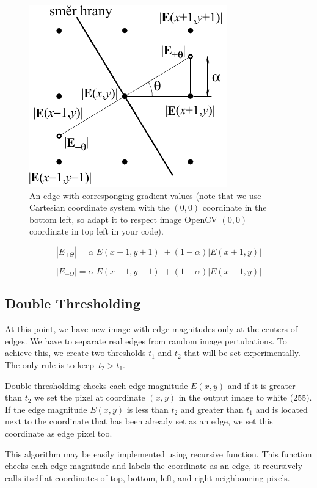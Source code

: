 \documentclass[12pt]{article}
\begin{document}
\begin{figure}[h]
\begin{centering}
    \includegraphics{pixel_scheme}
    \caption{An edge with corresponging gradient values (note that we use Cartesian coordinate system with the $(0, 0)$ coordinate in the bottom left, so adapt it to respect image OpenCV $(0, 0)$ coordinate in top left in your code).}
    \label{fig:pixel-scheme}
\end{centering}
\end{figure}

\begin{equation}
    |E_{+\Theta}| = \alpha |E(x + 1, y + 1)| + (1 - \alpha) |E(x + 1, y)|
    \label{eq:e-plus}
\end{equation}

\begin{equation}
    |E_{-\Theta}| = \alpha |E(x - 1, y - 1)| + (1 - \alpha) |E(x - 1, y)|
    \label{eq:e-minus}
\end{equation}

\subsection*{Double Thresholding}

At this point, we have new image with edge magnitudes only at the centers of edges.
We have to separate real edges from random image pertubations.
To achieve this, we create two thresholds $t_1$ and $t_2$ that will be set experimentally.
The only rule is to keep~$t_2 > t_1$.

Double thresholding checks each edge magnitude $E(x, y)$ and if it is greater than $t_2$ we set the pixel at coordinate $(x, y)$
in the output image to white (255). If the edge magnitude $E(x, y)$ is less than $t_2$ and greater than $t_1$ and is
located next to the coordinate that has been already set as an edge, we set this coordinate as edge pixel too.

This algorithm may be easily implemented using recursive function. This function checks each edge magnitude and labels
the coordinate as an edge, it recursively calls itself at coordinates of top, bottom, left, and right neighbouring pixels.
\end{document}
